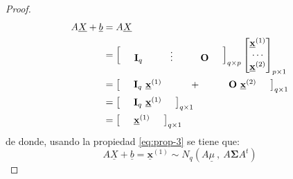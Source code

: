 \documentclass[
]{book}
\theoremstyle{definition}
\theoremstyle{definition}
\theoremstyle{definition}
\theoremstyle{definition}
\theoremstyle{remark}
\begin{document}
\begin{proof}
\begin{align*}
A\underline{X}+\underline{b}&=A\underline{X}\\
&=\begin{bmatrix}
\hspace{0.5cm} \mathbf{I}_q \hspace{1.0cm} \vdots \hspace{1.0cm} \mathbf{O} \hspace{0.5cm}
 \end{bmatrix}_{q\times p}\begin{bmatrix}
\underline{\mathbf{x}}^{(1)} \\ \cdots \\ \underline{\mathbf{x}}^{(2)}
\end{bmatrix}_{p\times 1} \\
&=\begin{bmatrix}
\hspace{0.5cm} \mathbf{I}_q \ \underline{\mathbf{x}}^{(1)} \hspace{1.0cm} + \hspace{1.0cm} \mathbf{O}\  \underline{\mathbf{x}}^{(2)} \hspace{0.5cm}
 \end{bmatrix}_{q\times 1}\\
 &=\begin{bmatrix}
\hspace{0.5cm} \mathbf{I}_q \ \underline{\mathbf{x}}^{(1)} \hspace{0.5cm}
 \end{bmatrix}_{q\times 1}\\
 &=\begin{bmatrix}
\hspace{0.5cm}  \underline{\mathbf{x}}^{(1)} \hspace{0.5cm}
 \end{bmatrix}_{q\times 1}
\end{align*}
de donde, usando la propiedad \eqref{eq:prop-3} se tiene que:
\[
A\underline{X}+\underline{b}=\underline{\mathbf{x}}^{(1)} \sim N_q(A\underline{\mu}\ , \ A\mathbf{\Sigma} A^t)
\]


\end{proof}
\end{document}
